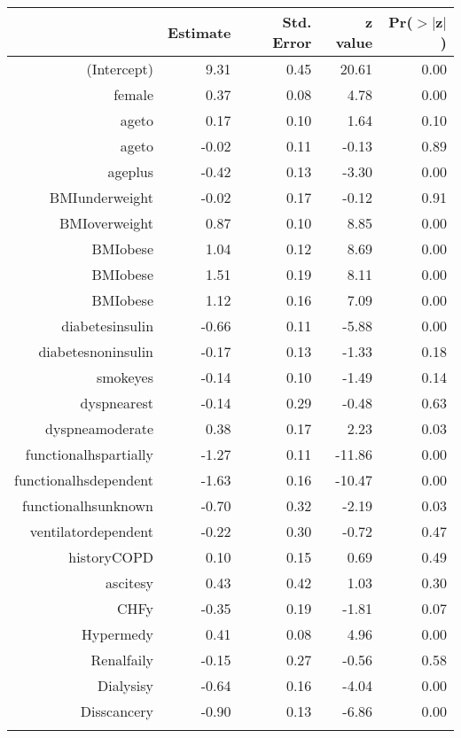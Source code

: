 \bigskip\bigskip
\centering
\begin{tabular}{rrrrr}
  \hline
 & Estimate & Std. Error & z value & Pr($>$$|$z$|$) \\ 
  \hline
(Intercept) & 9.31 & 0.45 & 20.61 & 0.00 \\ 
  female & 0.37 & 0.08 & 4.78 & 0.00 \\ 
  age\-65\-to\-74 & 0.17 & 0.10 & 1.64 & 0.10 \\ 
  age\-75\-to\-84 & -0.02 & 0.11 & -0.13 & 0.89 \\ 
  age\-85\-plus & -0.42 & 0.13 & -3.30 & 0.00 \\ 
  BMI\-underweight & -0.02 & 0.17 & -0.12 & 0.91 \\ 
  BMI\-overweight & 0.87 & 0.10 & 8.85 & 0.00 \\ 
  BMI\-obese\-1 & 1.04 & 0.12 & 8.69 & 0.00 \\ 
  BMI\-obese\-2 & 1.51 & 0.19 & 8.11 & 0.00 \\ 
  BMI\-obese\-3 & 1.12 & 0.16 & 7.09 & 0.00 \\ 
  diabetes\-insulin & -0.66 & 0.11 & -5.88 & 0.00 \\ 
  diabetes\-noninsulin & -0.17 & 0.13 & -1.33 & 0.18 \\ 
  smoke\-yes & -0.14 & 0.10 & -1.49 & 0.14 \\ 
  dyspnea\-rest & -0.14 & 0.29 & -0.48 & 0.63 \\ 
  dyspnea\-moderate & 0.38 & 0.17 & 2.23 & 0.03 \\ 
  functional\-hs\-partially & -1.27 & 0.11 & -11.86 & 0.00 \\ 
  functional\-hs\-dependent & -1.63 & 0.16 & -10.47 & 0.00 \\ 
  functional\-hs\-unknown & -0.70 & 0.32 & -2.19 & 0.03 \\ 
  ventilator\-dependent & -0.22 & 0.30 & -0.72 & 0.47 \\ 
  history\-COPD & 0.10 & 0.15 & 0.69 & 0.49 \\ 
  ascites\-y & 0.43 & 0.42 & 1.03 & 0.30 \\ 
  CHF\-y & -0.35 & 0.19 & -1.81 & 0.07 \\ 
  Hyper\-med\-y & 0.41 & 0.08 & 4.96 & 0.00 \\ 
  Renal\-fail\-y & -0.15 & 0.27 & -0.56 & 0.58 \\ 
  Dialysis\-y & -0.64 & 0.16 & -4.04 & 0.00 \\ 
  Diss\-cancer\-y & -0.90 & 0.13 & -6.86 & 0.00 \\ 
$$
\end{tabular}
